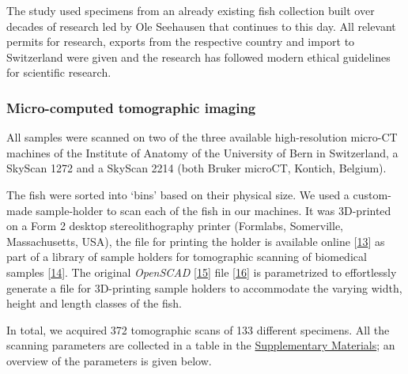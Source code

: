 The study used specimens from an already existing fish collection built over decades of research led by Ole Seehausen that continues to this day.
All relevant permits for research, exports from the respective country and import to Switzerland were given and the research has followed modern ethical guidelines for scientific research.

\hypertarget{micro-computed-tomographic-imaging}{%
\subsubsection{Micro-computed tomographic imaging}\label{micro-computed-tomographic-imaging}}

All samples were scanned on two of the three available high-resolution micro-CT machines of the Institute of Anatomy of the University of Bern in Switzerland, a SkyScan 1272 and a SkyScan 2214 (both Bruker microCT, Kontich, Belgium).

The fish were sorted into `bins' based on their physical size.
We used a custom-made sample-holder to scan each of the fish in our machines.
It was 3D-printed on a Form 2 desktop stereolithography printer (Formlabs, Somerville, Massachusetts, USA), the file for printing the holder is available online {[}\protect\hyperlink{ref-VCZPOv2f}{13}{]} as part of a library of sample holders for tomographic scanning of biomedical samples {[}\protect\hyperlink{ref-115PPSuQp}{14}{]}.
The original \emph{OpenSCAD} {[}\protect\hyperlink{ref-wsjdcTeC}{15}{]} file {[}\protect\hyperlink{ref-f7OzrzUv}{16}{]} is parametrized to effortlessly generate a file for 3D-printing sample holders to accommodate the varying width, height and length classes of the fish.

In total, we acquired 372 tomographic scans of 133 different specimens.
All the scanning parameters are collected in a table in the \protect\hyperlink{supplementary-materials}{Supplementary Materials}; an overview of the parameters is given below.

